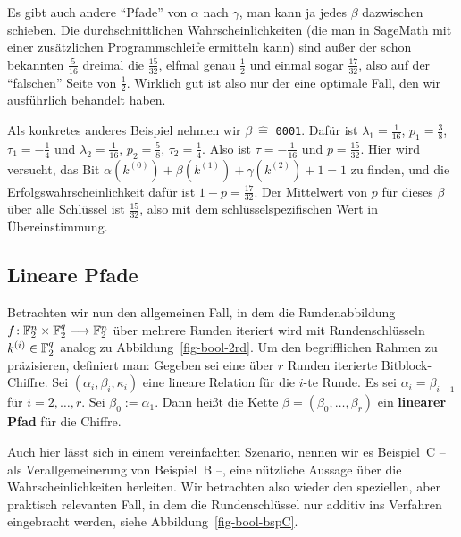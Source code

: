 \begin{refsegment}
Es gibt auch andere "`Pfade"' von $\alpha$ nach $\gamma$, man kann ja jedes
$\beta$ dazwischen schieben. Die durchschnittlichen Wahrscheinlichkeiten
(die man in SageMath mit einer zusätzlichen Programmschleife ermitteln kann)
sind außer der schon bekannten $\frac{5}{16}$ dreimal die $\frac{15}{32}$,
elfmal genau $\frac{1}{2}$ und einmal sogar $\frac{17}{32}$, also auf der
"`falschen"' Seite von $\frac{1}{2}$. Wirklich gut ist also nur der eine
optimale Fall, den wir ausführlich behandelt haben.

Als konkretes anderes Beispiel nehmen
wir $\beta \:\hat{=}$ \verb:0001:. Dafür ist $\lambda_1 = \frac{1}{16}$,
$p_1 = \frac{3}{8}$, $\tau_1 = -\frac{1}{4}$ und
$\lambda_2 = \frac{1}{16}$, $p_2 = \frac{5}{8}$, $\tau_2 = \frac{1}{4}$.
Also ist $\tau = -\frac{1}{16}$ und $p = \frac{15}{32}$.
Hier wird versucht, das Bit $\alpha(k^{(0)}) + \beta(k^{(1)}) + \gamma(k^{(2)}) + 1 = 1$
zu finden, und die Erfolgswahrscheinlichkeit dafür ist $1 - p = \frac{17}{32}$.
Der Mittelwert von $p$ für dieses $\beta$
über alle Schlüssel ist $\frac{15}{32}$, also mit dem
schlüsselspezifischen Wert in Übereinstimmung.

\subsection{Lineare Pfade}\label{ss-bool-path}

Betrachten wir nun den allgemeinen Fall, in dem die Rundenabbildung
\mbox{$f\!: \mathbb{F}_2^n \times \mathbb{F}_2^q \longrightarrow \mathbb{F}_2^n$} über mehrere Runden
iteriert wird mit Rundenschlüsseln $k^{(i)} \in \mathbb{F}_2^q$
analog zu Abbildung~\ref{fig-bool-2rd}.
Um den begrifflichen Rahmen zu präzisieren, definiert man: Gegeben sei eine
über $r$ Runden iterierte Bitblock-Chiffre.
Sei $(\alpha_i,\beta_i,\kappa_i)$ eine lineare
Relation für die $i$-te
Runde. Es sei $\alpha_i = \beta_{i-1}$ für $i = 2, \ldots, r$. Sei
$\beta_0 := \alpha_1$. Dann heißt die Kette
$\beta = (\beta_0, \ldots, \beta_r)$ ein
{\bf linearer Pfad} für die Chiffre.

Auch hier lässt sich in einem vereinfachten Szenario, nennen wir es
Beispiel~C -- als Verallgemeinerung von Beispiel~B --, eine nützliche
Aussage über die Wahrscheinlichkeiten herleiten. Wir betrachten also
wieder den speziellen, aber praktisch relevanten Fall, in dem die
Rundenschlüssel nur additiv ins Verfahren
eingebracht werden, siehe Abbildung~\ref{fig-bool-bspC}.


\end{refsegment}
